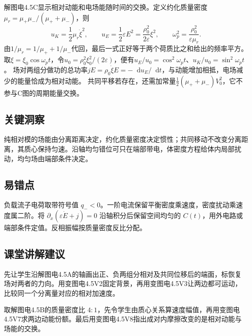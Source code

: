 \documentclass[UTF8,fontset=fandol,a4paper,11pt]{ctexart}
\newcommand{\dd}{\mathop{}\!\mathrm{d}}
\begin{document}
解图电4.5C显示相对动能和电场能随时间的交换。定义约化质量密度$\mu_r=\mu_+\mu_-/(\mu_++\mu_-)$，则
\[
u_K=\frac12\mu_r\dot\xi^2,\qquad
u_E=\frac12\varepsilon E^2=\frac{\rho_0^2}{2\varepsilon}\xi^2,\qquad
\omega_p^2=\frac{\rho_0^2}{\varepsilon\mu_r}.
\]
由$1/\mu_r=1/\mu_++1/\mu_-$代回，最后一式正好等于两个荷质比之和给出的频率平方。
取$\xi=\xi_0\cos\omega_pt$，令$u_0=\rho_0^2\xi_0^2/(2\varepsilon)$，便有$u_E/u_0=\cos^2\omega_pt$、$u_K/u_0=\sin^2\omega_pt$。
场对两组分做功的总功率$jE=\rho_0\dot\xi E=-\dd u_E/\dd t$，与动能增加相抵，电场减少的能量恰成为相对动能。
共同平移若存在，还需加常量$\tfrac12(\mu_++\mu_-)V_0^2$，它不参与C图的周期能量交换。




\subsection*{关键洞察}

纯相对模的场能由分离距离决定，约化质量密度决定惯性；共同移动不改变分离距离，其质心保持匀速。沿轴均匀错位可只在端部带电，体密度方程给体内局部扰动，均匀场由端部条件决定。



\subsection*{易错点}

负载流子电荷取带符号值 $q_-<0$。一阶电流保留平衡密度乘速度，密度扰动乘速度属二阶。将 $\partial_x(\varepsilon\dot E+j)=0$ 沿轴积分后保留空间均匀的 $C(t)$，用外电路或端部条件定值。反相振幅按质量密度反比分配。



\subsection*{课堂讲解建议}

先让学生沿解图电4.5A的轴画出正、负两组分相对及共同位移后的端面，标恢复场对两者的力向。用变图电4.5V2固定背景，再用变图电4.5V3让两边都可运动，比较同一个分离量对应的相对加速度。

取解图电4.5B的质量密度比 $4:1$，先令学生由质心关系算速度幅值，再用变图电4.5V7求两边动能份额。最后用变图电4.5V8指出成对内摩擦改变的是相对动能与场能的交换。
\end{document}
